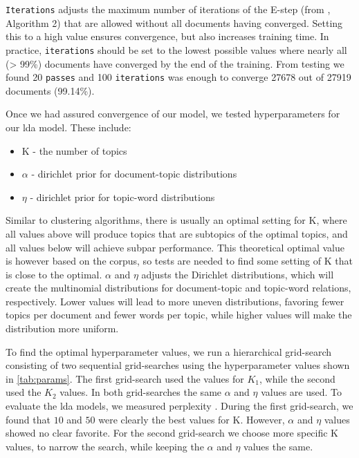 \texttt{Iterations} adjusts the maximum number of iterations of the E-step (from \citeauthor{blei2010online}\cite{blei2010online}, Algorithm 2) that are allowed without all documents having converged. 
Setting this to a high value ensures convergence, but also increases training time. 
In practice, \texttt{iterations} should be set to the lowest possible values where nearly all (> 99\%) documents have converged by the end of the training.
From testing we found 20 \texttt{passes} and 100 \texttt{iterations} was enough to converge 27678 out of 27919 documents (99.14\%).

Once we had assured convergence of our model, we tested hyperparameters for our \gls{lda} model.
These include:
\begin{itemize}
	\item K - the number of topics
	\item $\alpha$ - dirichlet prior for document-topic distributions
	\item $\eta$ - dirichlet prior for topic-word distributions
\end{itemize}
Similar to clustering algorithms, there is usually an optimal setting for K, where all values above will produce topics that are subtopics of the optimal topics, and all values below will achieve subpar performance.
This theoretical optimal value is however based on the corpus, so tests are needed to find some setting of K that is close to the optimal.
$\alpha$ and $\eta$ adjusts the Dirichlet distributions, which will create the multinomial distributions for document-topic and topic-word relations, respectively.
Lower values will lead to more uneven distributions, favoring fewer topics per document and fewer words per topic, while higher values will make the distribution more uniform.

To find the optimal hyperparameter values, we run a hierarchical grid-search consisting of two sequential grid-searches using the hyperparameter values shown in \autoref{tab:params}.
The first grid-search used the values for $K_1$, while the second used the $K_2$ values.
In both grid-searches the same $\alpha$ and $\eta$ values are used.
To evaluate the \gls{lda} models, we measured perplexity .
During the first grid-search, we found that $10$ and $50$ were clearly the best values for K.
However, $\alpha$ and $\eta$ values showed no clear favorite.
For the second grid-search we choose more specific K values, to narrow the search, while keeping the $\alpha$ and $\eta$ values the same.

